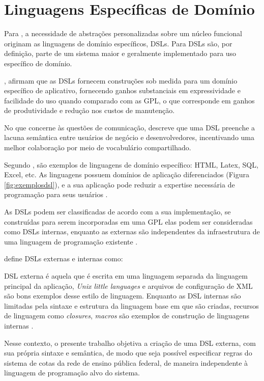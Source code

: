 \section{Linguagens Específicas de Domínio}
\label{sec:dsl}

Para , a necessidade de abstrações personalizadas sobre um núcleo funcional originam as linguagens de domínio específicos, \gls{DSL}s. Para  \gls{DSL}s são, por definição, parte de um sistema maior e geralmente implementado para uso específico de domínio.

, afirmam que as \gls{DSL}s fornecem construções sob medida para um domínio específico de aplicativo, fornecendo ganhos substanciais em expressividade e facilidade do uso quando comparado com as \gls{GPL}, o que corresponde em ganhos de produtividade e redução nos custos de manutenção.

No que concerne às questões de comunicação,  descreve que uma \gls{DSL} preenche a lacuna semântica entre usuários de negócio e desenvolvedores, incentivando uma melhor colaboração por meio de vocabulário compartilhado.  

Segundo , são exemplos de linguagens de domínio específico: HTML, Latex, SQL, Excel, etc. As linguagens possuem domínios de aplicação diferenciados (Figura \ref{fig:exemplosdsl}), e a sua aplicação pode reduzir a expertise necessária de programação para seus usuários .




As \gls{DSL}s podem ser classificadas de acordo com a sua implementação, se construídas para serem incorporadas em uma \gls{GPL} elas podem ser consideradas como \gls{DSL}s internas, enquanto as externas são independentes da infraestrutura de uma linguagem de programação existente \cite{dslengineering}.

 define \gls{DSL}s externas e internas como:

\begin{citacao} 
\gls{DSL} externa é aquela que é escrita em uma linguagem separada da linguagem principal da aplicação, \textit{Unix little languages} e arquivos de configuração de \gls{XML} são bons exemplos desse estilo de linguagem. Enquanto as \gls{DSL} internas são limitadas pela sintaxe e estrutura da linguagem base em que são criadas, recursos de linguagem como \textit{closures}, \textit{macros} são exemplos de construção de linguagens internas \cite[s/p, tradução nossa]{fowler2005language}.
\end{citacao}


Nesse contexto, o presente trabalho objetiva a criação de uma \gls{DSL} externa, com sua própria sintaxe e semântica, de modo que seja possível especificar regras do sistema de cotas da rede de ensino pública federal, de maneira independente à linguagem de programação alvo do sistema. 



